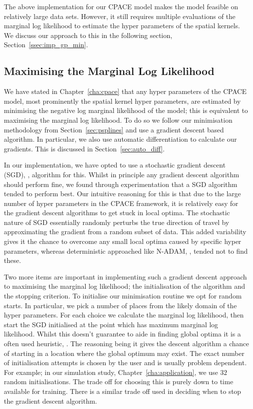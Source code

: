 The above implementation for our CPACE model makes the model feasible on relatively large data sets.
However, it still requires multiple evaluations of the marginal log likelihood to estimate the hyper parameters of the spatial kernels.
We discuss our approach to this in the following section, Section~\ref{ssec:imp_gp_min}.

\subsection{Maximising the Marginal Log Likelihood \label{ssec:imp_gp_min}}
We have stated in Chapter~\ref{cha:cpace} that any hyper parameters of the CPACE model, most prominently the spatial kernel hyper parameters, are estimated by minimising the negative log marginal likelihood of the model; this is equivalent to maximising the marginal log likelihood.
To do so we follow our minimisation methodology from Section~\ref{sec:psplines} and use a gradient descent based algorithm.
In particular, we also use automatic differentiation to calculate our gradients.
This is discussed in Section~\ref{sec:auto_diff}.

In our implementation, we have opted to use a stochastic gradient descent (SGD), \citep{sra_optimization_2012}, algorithm for this.
Whilst in principle any gradient descent algorithm should perform fine, we found through experimentation that a SGD algorithm tended to perform best.
Our intuitive reasoning for this is that due to the large number of hyper parameters in the CPACE framework, it is relatively easy for the gradient descent algorithms to get stuck in local optima.
The stochastic nature of SGD essentially randomly perturbs the true direction of travel by approximating the gradient from a random subset of data. 
This added variability gives it the chance to overcome any small local optima caused by specific hyper parameters, whereas deterministic approached like N-ADAM, \citep{dozat_incorporating_2016}, tended not to find these.

Two more items are important in implementing such a gradient descent approach to maximising the marginal log likelihood; the initialisation of the algorithm and the stopping criterion.
To initialise our minimisation routine we opt for random starts.
In particular, we pick a number of places from the likely domain of the hyper parameters.
For each choice we calculate the marginal log likelihood, then start the SGD initialised at the point which has maximum marginal log likelihood.
Whilst this doesn't guarantee to aide in finding global optima it is a often used heuristic, \citep{sra_optimization_2012}.
The reasoning being it gives the descent algorithm a chance of starting in a location where the global optimum may exist.
The exact number of initialisation attempts is chosen by the user and is usually problem dependent. 
For example; in our simulation study, Chapter~\ref{cha:application},  we use $32$ random initialisations.
The trade off for choosing this is purely down to time available for training.
There is a similar trade off used in deciding when to stop the gradient descent algorithm.

